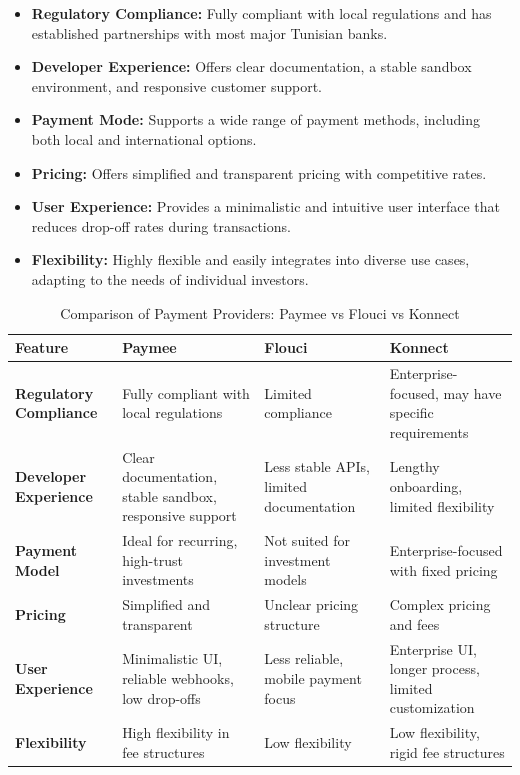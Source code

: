 \begin{itemize}
  \item \textbf{Regulatory Compliance:} Fully compliant with local regulations and has established partnerships with most major Tunisian banks.
  
  \item \textbf{Developer Experience:} Offers clear documentation, a stable sandbox environment, and responsive customer support.
  
  \item \textbf{Payment Mode:} Supports a wide range of payment methods, including both local and international options.
  
  \item \textbf{Pricing:} Offers simplified and transparent pricing with competitive rates.
  
  \item \textbf{User Experience:} Provides a minimalistic and intuitive user interface that reduces drop-off rates during transactions.
  
  \item \textbf{Flexibility:} Highly flexible and easily integrates into diverse use cases, adapting to the needs of individual investors.
\end{itemize}

\begin{table}[htbp]
\centering
\caption{Comparison of Payment Providers: Paymee vs Flouci vs Konnect}
\label{tab:payment_comparison}
\begin{tabular}{|p{4cm}|p{3.5cm}|p{3.5cm}|p{3.5cm}|}
\hline
\textbf{Feature} & \textbf{Paymee} & \textbf{Flouci} & \textbf{Konnect} \\ \hline
\textbf{Regulatory Compliance} & Fully compliant with local regulations & Limited compliance & Enterprise-focused, may have specific requirements \\ \hline
\textbf{Developer Experience} & Clear documentation, stable sandbox, responsive support & Less stable APIs, limited documentation & Lengthy onboarding, limited flexibility \\ \hline
\textbf{Payment Model} & Ideal for recurring, high-trust investments & Not suited for investment models & Enterprise-focused with fixed pricing \\ \hline
\textbf{Pricing} & Simplified and transparent & Unclear pricing structure & Complex pricing and fees \\ \hline
\textbf{User Experience} & Minimalistic UI, reliable webhooks, low drop-offs & Less reliable, mobile payment focus & Enterprise UI, longer process, limited customization \\ \hline
\textbf{Flexibility} & High flexibility in fee structures & Low flexibility & Low flexibility, rigid fee structures \\ \hline
\end{tabular}
\end{table}

